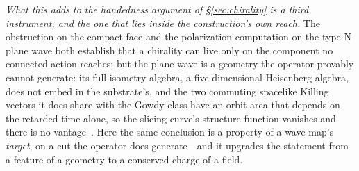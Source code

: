 \documentclass[11pt,a4paper]{article}
\theoremstyle{plain}
\theoremstyle{definition}
\theoremstyle{remark}
\begin{document}
\emph{What this adds to the handedness argument of \S\ref{sec:chirality} is a third instrument, and the one that lies inside the construction's own reach.} The obstruction on the compact face and the polarization computation on the type-N plane wave both establish that a chirality can live only on the component no connected action reaches; but the plane wave is a geometry the operator provably cannot generate: its full isometry algebra, a five-dimensional Heisenberg algebra, does not embed in the substrate's, and the two commuting spacelike Killing vectors it does share with the Gowdy class have an orbit area that depends on the retarded time alone, so the slicing curve's structure function vanishes and there is no vantage~\cite{JanzenRange}. Here the same conclusion is a property of a wave map's \emph{target}, on a cut the operator does generate---and it upgrades the statement from a feature of a geometry to a conserved charge of a field.
\end{document}
